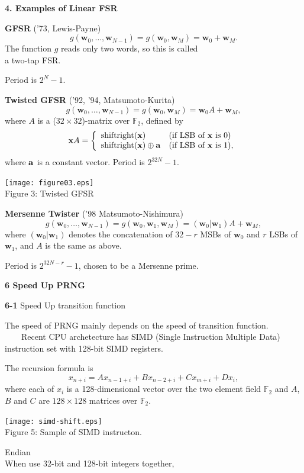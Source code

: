 \documentclass[a4j,12pt,landscape]{jarticle}
\def\F2{{\mathbb F}_2}
\def\bx{{{\mathbf x}}}
\def\bw{{{\mathbf w}}}
\begin{document}
\newpage
\noindent
{\bf 4. Examples of Linear FSR}

{\bf GFSR} ('73, Lewis-Payne)
$$
g(\bw_0,\ldots,\bw_{N-1}) = g(\bw_0, \bw_M) = \bw_0 + \bw_M.
$$
The function $g$ reads only two words, so this is called \\
a two-tap FSR.

Period is $2^N-1$.

\newpage
{\bf Twisted GFSR} ('92, '94, Matsumoto-Kurita)
$$
g(\bw_0,\ldots,\bw_{N-1}) = g(\bw_0, \bw_M) = \bw_0A + \bw_M,
$$
where $A$ is a ($32\times 32$)-matrix over $\F2$, defined by
$$
\bx A = 
\left\{\begin{array}{ll}
  \mbox{shiftright}({\bf x}) & (\mbox{if LSB of $\bx$ is 0}) \\
  \mbox{shiftright}({\bf x})\oplus{\bf a} & 
  (\mbox{if LSB of $\bx$ is 1}),
\end{array}\right.
$$
where ${\bf a}$ is a constant vector.
Period is $2^{32N}-1$. 
\begin{center}
\texttt{[image: figure03.eps]}
\\
Figure 3: Twisted GFSR
\end{center}
\newpage
{\bf Mersenne Twister} ('98 Matsumoto-Nishimura)
$$
g(\bw_0,\ldots,\bw_{N-1}) = g(\bw_0, \bw_1, \bw_M) = (\bw_0|\bw_1)A + \bw_M,
$$
where $(\bw_0|\bw_1)$ denotes
the concatenation of $32-r$ MSBs of $\bw_0$ and $r$ LSBs of $\bw_1$,
and $A$ is the same as above.

Period is $2^{32N-r}-1$, chosen to be a Mersenne prime.

\newpage
\noindent
{\bf 6 Speed Up PRNG}

{\bf 6-1} Speed Up transition function

The speed of PRNG mainly depends on
the speed of transition function.\\
~~~~Recent CPU archetecture has SIMD (Single Instruction Multiple
Data) instruction set with 128-bit SIMD registers.

The recursion formula is
\[x_{n+i} = Ax_{n-1+i} + Bx_{n-2+i}+ Cx_{m+i} + Dx_{i},\]
where each of $x_i$ is a 128-dimensional vector over the two 
element field ${\mathbb F}_2$ and
$A$, $B$ and $C$ are $128 \times 128$ matrices over
${\mathbb F}_2$.

\begin{center}
\texttt{[image: simd-shift.eps]}
\\
Figure 5: Sample of SIMD instructon.
\end{center}
\newpage
Endian\\
When use 32-bit and 128-bit integers together,
\end{document}
